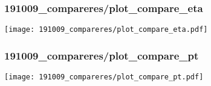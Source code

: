 \begin{frame}
   \frametitle{\small 191009\_compareres/plot\_compare\_eta}
   \centering
   \texttt{[image: 191009\_compareres/plot\_compare\_eta.pdf]}
\end{frame}

\begin{frame}
   \frametitle{\small 191009\_compareres/plot\_compare\_pt}
   \centering
   \texttt{[image: 191009\_compareres/plot\_compare\_pt.pdf]}
\end{frame}

